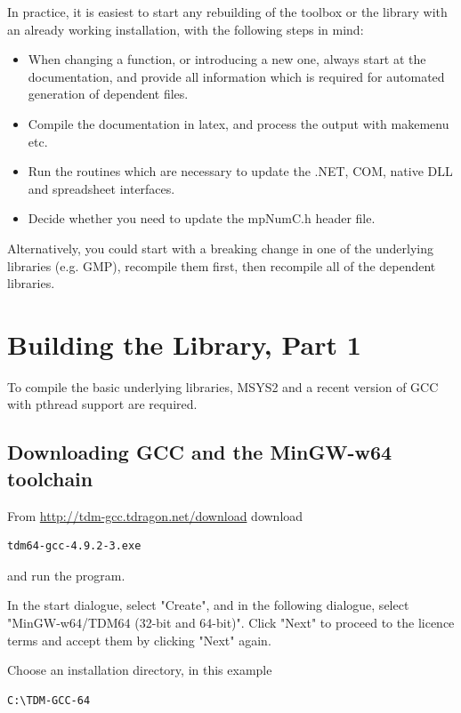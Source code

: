 In practice, it is easiest to start any rebuilding of the toolbox or the library with an already working installation, with the following steps in mind:

\begin{itemize}
	\item When changing a function, or introducing a new one, always start at the documentation, and provide all information which is required for automated generation of dependent files.
	\item Compile the documentation in latex, and process the output with makemenu etc.
	\item Run the routines which are necessary to update the .NET, COM, native DLL and spreadsheet interfaces.
	\item Decide whether you need to update the mpNumC.h header file.
\end{itemize}

Alternatively, you could start with a breaking change in one of the underlying libraries (e.g. GMP), recompile them first, then recompile all of the dependent libraries.




\newpage
\section{Building the Library, Part 1}

To compile the basic underlying libraries, MSYS2 and a recent version of GCC with pthread support are required. 


\subsection{Downloading GCC and the MinGW-w64 toolchain}

From \href{http://tdm-gcc.tdragon.net/download}{http://tdm-gcc.tdragon.net/download} download
\begin{verbatim}
tdm64-gcc-4.9.2-3.exe
\end{verbatim}
and run the program.

In the start dialogue, select "Create", and in the following dialogue, select  "MinGW-w64/TDM64 (32-bit and 64-bit)". Click "Next" to proceed to the licence terms and accept them by clicking "Next" again.

Choose an installation directory, in this example

\begin{verbatim}
C:\TDM-GCC-64
\end{verbatim}

